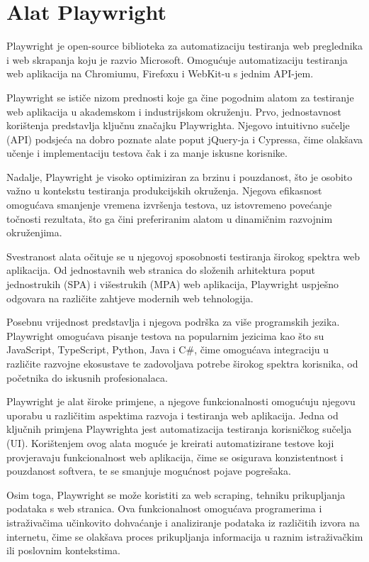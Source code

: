 \chapter{Alat Playwright}\label{ch_playwright}
Playwright je open-source biblioteka za automatizaciju testiranja web preglednika i web skrapanja koju je razvio Microsoft.
Omogućuje automatizaciju testiranja web aplikacija na Chromiumu, Firefoxu i WebKit-u s jednim API-jem.

Playwright se ističe nizom prednosti koje ga čine pogodnim alatom za testiranje web aplikacija u akademskom i industrijskom okruženju.
Prvo, jednostavnost korištenja predstavlja ključnu značajku Playwrighta.
Njegovo intuitivno sučelje (API) podsjeća na dobro poznate alate poput jQuery-ja i Cypressa, čime olakšava učenje i implementaciju testova čak i za manje iskusne korisnike.

Nadalje, Playwright je visoko optimiziran za brzinu i pouzdanost, što je osobito važno u kontekstu testiranja produkcijskih okruženja.
Njegova efikasnost omogućava smanjenje vremena izvršenja testova, uz istovremeno povećanje točnosti rezultata, što ga čini preferiranim alatom u dinamičnim razvojnim okruženjima.

Svestranost alata očituje se u njegovoj sposobnosti testiranja širokog spektra web aplikacija.
Od jednostavnih web stranica do složenih arhitektura poput jednostrukih (SPA) i višestrukih (MPA) web aplikacija, Playwright uspješno odgovara na različite zahtjeve modernih web tehnologija.

Posebnu vrijednost predstavlja i njegova podrška za više programskih jezika.
Playwright omogućava pisanje testova na popularnim jezicima kao što su JavaScript, TypeScript, Python, Java i C\#, čime omogućava integraciju u različite razvojne ekosustave te zadovoljava potrebe širokog spektra korisnika, od početnika do iskusnih profesionalaca.

Playwright je alat široke primjene, a njegove funkcionalnosti omogućuju njegovu uporabu u različitim aspektima razvoja i testiranja web aplikacija.
Jedna od ključnih primjena Playwrighta jest automatizacija testiranja korisničkog sučelja (UI).
Korištenjem ovog alata moguće je kreirati automatizirane testove koji provjeravaju funkcionalnost web aplikacija, čime se osigurava konzistentnost i pouzdanost softvera, te se smanjuje mogućnost pojave pogrešaka.

Osim toga, Playwright se može koristiti za web scraping, tehniku prikupljanja podataka s web stranica.
Ova funkcionalnost omogućava programerima i istraživačima učinkovito dohvaćanje i analiziranje podataka iz različitih izvora na internetu, čime se olakšava proces prikupljanja informacija u raznim istraživačkim ili poslovnim kontekstima.

